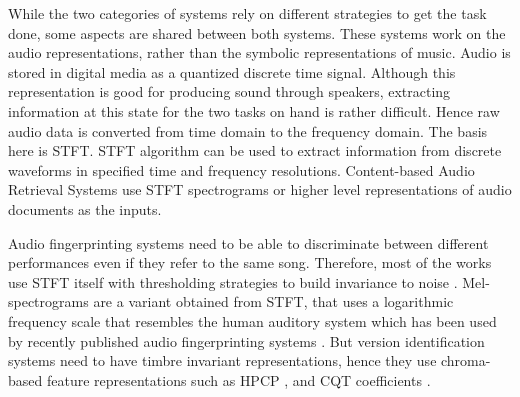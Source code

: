 \documentclass[../main.tex]{subfiles}
\begin{document}
\par
While the two categories of systems rely on different strategies to get the task done, some aspects are shared between both systems. These systems work on the audio representations, rather than the symbolic representations of music. Audio is stored in digital media as a quantized discrete time signal. Although this representation is good for producing sound through speakers, extracting information at this state for the two tasks on hand is rather difficult. Hence raw audio data is converted from time domain to the frequency domain. The basis here is \Gls{STFT}.  \Gls{STFT} algorithm can be used to extract information from discrete waveforms in specified time and frequency resolutions. Content-based Audio Retrieval Systems use \gls{STFT} spectrograms or higher level representations of audio documents as the inputs.

\iffalse
Figure \ref{fig:representations} shows some of these representations \cite{book}.

\begin{figure}[H]
    \centering
    \texttt{[image: representations.png]}
    \caption{Various representations for a recording of the chromatic scale played on a real piano. (a) Piano keys representing the chromatic scale. (b) Magnitude spectrogram. (c) Pitch-based log-frequency spectrogram. (d) Chromagram.}
    \label{fig:representations}
\end{figure}
\fi


\par
Audio fingerprinting systems need to be able to discriminate between different performances even if they refer to the same song. Therefore, most of the works use \gls{STFT} itself with thresholding strategies to build invariance to noise \cite{haitsmaHighlyRobustAudio2002,sift,ellisEchoPrintOpenSource2011,wangIndustrialStrengthAudio2003,computer_vision_for_music_identification}. Mel-spectrograms are a variant obtained from \gls{STFT}, that uses a logarithmic frequency scale that resembles the human auditory system which has been used by recently published audio fingerprinting systems \cite{yu_contrastive_2020,baez_suarez_unsupervised_2020}. But version identification systems need to have timbre invariant representations, hence they use chroma-based feature representations such as \gls{HPCP} \cite{gomezSongRemainsSame2006,serraChromaBinarySimilarity2008,serraCrossRecurrenceQuantification2009,yesilerAccurateScalableVersion2020}, and \gls{CQT} coefficients \cite{yuTemporalPyramidPooling2019,dorasCoverDetectionUsing2019,jiang_yang_chen_2020}.
\end{document}
